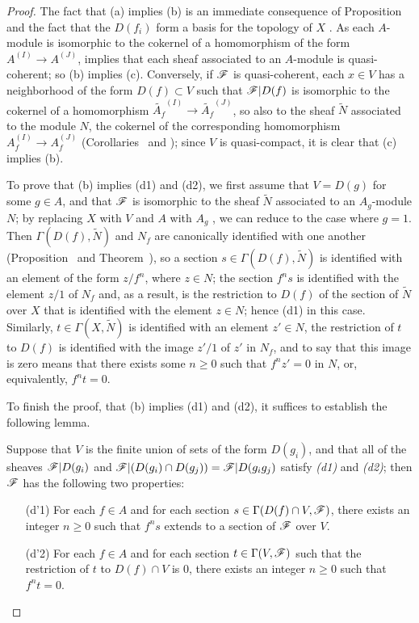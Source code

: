 \begin{proof}
\label{proof-I.1.4.1}
The fact that (a) implies (b) is an immediate consequence of Proposition~ and the fact that the $D(f_i)$ form a basis for the topology of $X$ .
As each $A$-module is isomorphic to the cokernel of a homomorphism of the form $A^{(I)}\to A^{(J)}$,  implies that each sheaf associated to an $A$-module is quasi-coherent;
so (b) implies (c).
Conversely, if $\mathscr{F}$ is quasi-coherent, each $x\in V$ has a neighborhood of the form $D(f)\subset V$ such that $\mathscr{F}|D(f)$ is isomorphic to the cokernel of a homomorphism $\widetilde{A_f}^{(I)}\to\widetilde{A_f}^{(J)}$, so also to the sheaf $\widetilde{N}$ associated to the module $N$, the cokernel of the corresponding homomorphism
$A_f^{(I)}\to A_f^{(J)}$ (Corollaries~ and );
since $V$ is quasi-compact, it is clear that (c) implies (b).

To prove that (b) implies (d1) and (d2), we first assume that $V=D(g)$ for some $g\in A$, and that $\mathscr{F}$ is isomorphic to the sheaf $\widetilde{N}$ associated to an $A_g$-module $N$;
by replacing $X$ with $V$ and $A$ with $A_g$ , we can reduce to the case where $g=1$.
Then $\Gamma(D(f),\widetilde{N})$ and $N_f$ are canonically identified with one another (Proposition~ and Theorem~), so a section $s\in\Gamma(D(f),\widetilde{N})$ is identified with an element of the form $z/f^n$, where $z\in N$;
the section $f^n s$ is identified with the element $z/1$ of $N_f$ and, as a result, is the restriction to $D(f)$ of the section of $\widetilde{N}$ over $X$ that is identified with the element $z\in N$;
hence (d1) in this case.
Similarly, $t\in\Gamma(X,\widetilde{N})$ is identified with an element $z'\in N$, the restriction of $t$ to $D(f)$ is identified with the image $z'/1$ of $z'$ in $N_f$, and to say that this image is zero means that there exists some $n\geq 0$ such that $f^n z'=0$ in $N$, or, equivalently, $f^n t=0$.

To finish the proof, that (b) implies (d1) and (d2), it suffices to establish the following lemma.
\begin{lemma}[1.4.1.1]
\label{I.1.4.1.1}
Suppose that $V$ is the finite union of sets of the form $D(g_i)$, and that all of the sheaves $\mathscr{F}|D(g_i)$ and $\mathscr{F}|(D(g_i)\cap D(g_j))=\mathscr{F}|D(g_i g_j)$ satisfy \emph{(d1)} and \emph{(d2)};
then $\mathscr{F}$ has the following two properties:
\begin{enumerate}
  \item[{\rm(d'1)}] For each $f\in A$ and for each section $s\in\Gamma(D(f)\cap V,\mathscr{F})$, there exists an integer $n\geq 0$ such that $f^n s$ extends to a section of $\mathscr{F}$ over $V$.
  \item[{\rm(d'2)}] For each $f\in A$ and for each section $t\in\Gamma(V,\mathscr{F})$ such that the restriction of $t$ to $D(f)\cap V$ is $0$, there exists an integer $n\geq 0$ such that $f^n t=0$.
\end{enumerate}
\end{lemma}


\end{proof}
